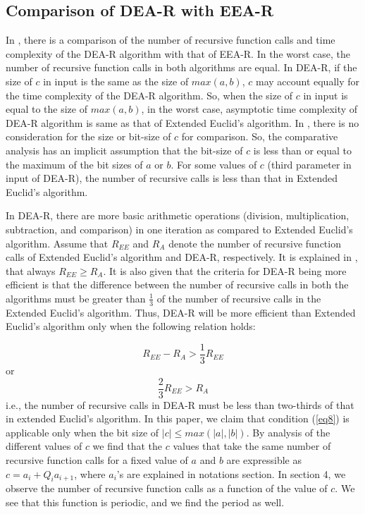 \documentclass[pdflatex,sn-mathphys-num]{sn-jnl}%
\theoremstyle{thmstyleone}%
\theoremstyle{thmstyletwo}%
\theoremstyle{thmstylethree}%
\begin{document}
\subsection{Comparison of DEA-R with EEA-R} 
In \cite{deora2023algorithm}, there is a comparison of the number of recursive function calls and time complexity of the DEA-R algorithm with that of EEA-R. In the worst case, the number of recursive function calls in both algorithms are equal. In DEA-R, if the size of $c$ in input is the same as the size of $max(a,b)$, $c$ may account equally for the time complexity of the DEA-R algorithm. So, when the size of $c$ in input is equal to the size of $max(a,b)$, in the worst case, asymptotic time complexity of DEA-R algorithm is same as that of Extended Euclid's algorithm. In \cite{deora2023algorithm}, there is no consideration for the size or bit-size of $c$ for comparison. So, the comparative analysis has an implicit assumption that the bit-size of $c$ is less than or equal to the maximum of the bit sizes of $a$ or $b$. For some values of $c$ (third parameter in input of DEA-R), the number of recursive calls is less than that in Extended Euclid's algorithm.

In DEA-R, there are more basic arithmetic operations (division, multiplication, subtraction, and comparison) in one iteration as compared to Extended Euclid's algorithm. Assume that $R_{EE}$ and $R_{A}$ denote the number of recursive function calls of Extended Euclid's algorithm and DEA-R, respectively. It is explained in \cite{deora2023algorithm}, that always $R_{EE} \ge R_A$. It is also given that the criteria for DEA-R being more efficient is that the difference between the number of recursive calls in both the algorithms must be greater than $\frac{1}{3}$ of the number of recursive calls in the Extended Euclid's algorithm. Thus, DEA-R will be more efficient than Extended Euclid's algorithm only when the following relation holds:

$$R_{EE}-R_{A}>\frac{1}{3}R_{EE}$$
or \begin{equation} \label{eq8}
   \frac{2}{3} R_{EE} >  R_A 
\end{equation}
i.e., the number of recursive calls in DEA-R must be less than two-thirds of that in extended Euclid's algorithm. In this paper, we claim that condition (\ref{eq8}) is applicable only when the bit size of $|c|\le max(|a|,|b|)$. By analysis of the different values of $c$ we find that the $c$ values that take the same number of recursive function calls for a fixed value of $a$ and $b$ are expressible as $c=a_i+Q_ia_{i+1}$, where $a_i$'s are explained in notations section. In section 4, we observe the number of recursive function calls as a function of the value of $c$. We see that this function is periodic, and we find the period as well. 
\end{document}
